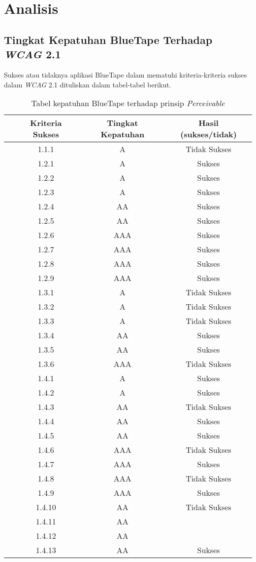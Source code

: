 \chapter{Analisis}
\label{chap:analisis}

\section{Tingkat Kepatuhan BlueTape Terhadap \textit{WCAG} 2.1}
Sukses atau tidaknya aplikasi BlueTape dalam mematuhi kriteria-kriteria sukses dalam \textit{WCAG} 2.1 dituliskan dalam tabel-tabel berikut.
\label{sec:kepatuhan_bluetape_terhadap_wcag_2.1}
\begin{table}[H]
    \centering 
    \caption{Tabel kepatuhan BlueTape terhadap prinsip \textit{Perceivable}}
    \label{tab:kepatuhan_bluetape_perceivable}
    \begin{tabular}{cccc}
        \toprule
        & Kriteria Sukses & Tingkat Kepatuhan & Hasil (sukses/tidak)\\

        \midrule
        & 1.1.1 & A & Tidak Sukses \\
        & 1.2.1 & A & Sukses \\
        & 1.2.2 & A & Sukses \\
        & 1.2.3 & A & Sukses \\
        & 1.2.4 & AA & Sukses \\
        & 1.2.5 & AA & Sukses \\
        & 1.2.6 & AAA & Sukses \\
        & 1.2.7 & AAA & Sukses \\
        & 1.2.8 & AAA & Sukses \\
        & 1.2.9 & AAA & Sukses \\
        & 1.3.1 & A & Tidak Sukses \\
        & 1.3.2 & A & Tidak Sukses \\
        & 1.3.3 & A & Tidak Sukses \\
        & 1.3.4 & AA & Sukses \\
        & 1.3.5 & AA & Sukses \\
        & 1.3.6 & AAA & Tidak Sukses \\
        & 1.4.1 & A & Sukses \\
        & 1.4.2 & A & Sukses \\
        & 1.4.3 & AA & Tidak Sukses \\
        & 1.4.4 & AA & Sukses \\
        & 1.4.5 & AA & Sukses \\
        & 1.4.6 & AAA & Tidak Sukses \\
        & 1.4.7 & AAA & Sukses \\
        & 1.4.8 & AAA & Tidak Sukses \\
        & 1.4.9 & AAA & Sukses \\
        & 1.4.10 & AA & Tidak Sukses \\
        & 1.4.11 & AA & \\
        & 1.4.12 & AA & \\
        & 1.4.13 & AA & Sukses \\
        

\end{tabular}
\end{table}
